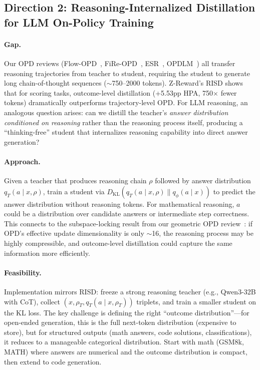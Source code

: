 \documentclass[11pt,a4paper]{article}
\begin{document}
\subsection{Direction 2: Reasoning-Internalized Distillation for LLM On-Policy Training}

\paragraph{Gap.} Our OPD reviews (Flow-OPD~\cite{fu2026flowopd}, FiRe-OPD~\cite{li2026fireopd}, ESR~\cite{wang2026esr}, OPDLM~\cite{su2026opdlm}) all transfer reasoning trajectories from teacher to student, requiring the student to generate long chain-of-thought sequences ($\sim$750--2000 tokens). Z-Reward's RISD shows that for scoring tasks, outcome-level distillation (+5.53pp HPA, 750$\times$ fewer tokens) dramatically outperforms trajectory-level OPD. For LLM reasoning, an analogous question arises: can we distill the teacher's \emph{answer distribution conditioned on reasoning} rather than the reasoning process itself, producing a ``thinking-free'' student that internalizes reasoning capability into direct answer generation?

\paragraph{Approach.} Given a teacher that produces reasoning chain $\rho$ followed by answer distribution $q_T(a \mid x, \rho)$, train a student via $D_{\mathrm{KL}}(q_T(a \mid x, \rho) \| q_\phi(a \mid x))$ to predict the answer distribution without reasoning tokens. For mathematical reasoning, $a$ could be a distribution over candidate answers or intermediate step correctness. This connects to the subspace-locking result from our geometric OPD review~\cite{shen2026geometry}: if OPD's effective update dimensionality is only $\sim$16, the reasoning process may be highly compressible, and outcome-level distillation could capture the same information more efficiently.

\paragraph{Feasibility.} Implementation mirrors RISD: freeze a strong reasoning teacher (e.g., Qwen3-32B with CoT), collect $(x, \rho_T, q_T(a \mid x, \rho_T))$ triplets, and train a smaller student on the KL loss. The key challenge is defining the right ``outcome distribution''---for open-ended generation, this is the full next-token distribution (expensive to store), but for structured outputs (math answers, code solutions, classifications), it reduces to a manageable categorical distribution. Start with math (GSM8k, MATH) where answers are numerical and the outcome distribution is compact, then extend to code generation.
\end{document}
